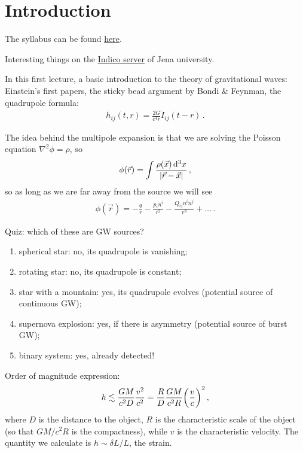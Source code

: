 \documentclass[main.tex]{subfiles}
\begin{document}
\section*{Introduction}


The syllabus can be found \href{http://sbernuzzi.gitpages.tpi.uni-jena.de/gw/}{here}.

Interesting things on the \href{https://indico.tpi.uni-jena.de/}{Indico server} of Jena university.

In this first lecture, a basic introduction to the theory of gravitational waves: Einstein's first papers, the sticky bead argument by Bondi \& Feynman, the quadrupole formula: 
%
\begin{align}
\overline{h}_{ij} (t, r) = \frac{2G}{c^{4} r} \ddot{I}_{ij} (t - r)
\,.
\end{align}

The idea behind the multipole expansion is that we are solving the Poisson equation \(\nabla^2 \phi = \rho \), so 
%
\begin{align}
\phi (\vec{r}) = \int \frac{ \rho (\vec{x}) \dd[3]{x}}{\abs{\vec{r} - \vec{x}}}
\,,
\end{align}
%
so as long as we are far away from the source we will see 
%
\begin{align}
\phi (\vec{r}) = - \frac{q}{r} - \frac{p_i n^i}{r^2} - \frac{Q_{ij}n^i n^j}{r^3} + \dots
\,.
\end{align}

Quiz: which of these are GW sources? 
\begin{enumerate}
    \item spherical star: no, its quadrupole is vanishing;
    \item rotating star: no, its quadrupole is constant;
    \item star with a mountain: yes, its quadrupole evolves (potential source of continuous GW);
    \item supernova explosion: yes, if there is asymmetry (potential source of burst GW);
    \item binary system: yes, already detected!
\end{enumerate}

\begin{claim}

Order of magnitude expression: 
%
\begin{align}
h \lesssim \frac{GM}{c^2 D} \frac{v^2}{c^2} = \frac{R}{D} \frac{GM}{c^2 R} \qty( \frac{v}{c})^2
\,,
\end{align}
%
where \(D\) is the distance to the object, \(R\) is the characteristic scale of the object (so that \(GM / c^2 R\) is the compactness), while \(v\) is the characteristic velocity. The quantity we calculate is \(h \sim \delta L / L\), the strain.
\end{claim}
\end{document}

